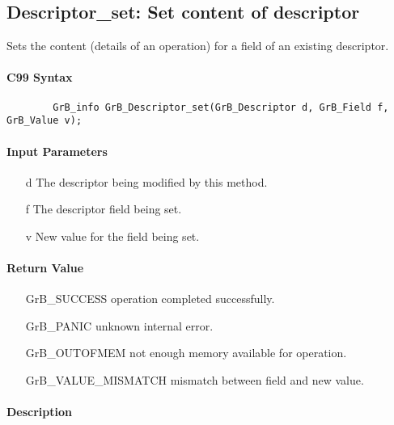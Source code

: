 \subsection{{\sf Descriptor\_set}: Set content of descriptor}

Sets the content (details of an operation) for a field of an existing
descriptor.

\paragraph{C99 Syntax}

\begin{verbatim}
        GrB_info GrB_Descriptor_set(GrB_Descriptor d, GrB_Field f, GrB_Value v);
\end{verbatim}

\paragraph{Input Parameters}

\begin{itemize}[leftmargin=1.1in]
    \item[{\sf d}] The descriptor being modified by this method.
    \item[{\sf f}] The descriptor field being set.
    \item[{\sf v}] New value for the field being set.
\end{itemize}

\paragraph{Return Value}

\begin{itemize}[leftmargin=2.1in]
\item[{\sf GrB\_SUCCESS}]           operation completed successfully.
\item[{\sf GrB\_PANIC}]             unknown internal error.
\item[{\sf GrB\_OUTOFMEM}]          not enough memory available for operation.
\item[{\sf GrB\_VALUE\_MISMATCH}]   mismatch between field and new value.
\end{itemize}

\paragraph{Description}

